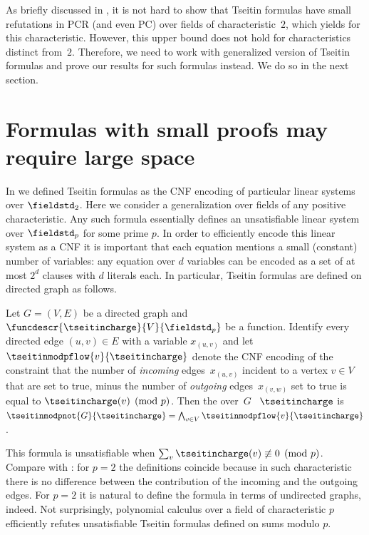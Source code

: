 As briefly discussed in 
, 
it is not hard to show that Tseitin formulas have small 
refutations in PCR (and even PC) over fields of characteristic~$2$,
which yields
for this characteristic. 
However, this upper bound does not hold for characteristics distinct
from~$2$. 
%
Therefore, we need to work with generalized version of Tseitin formulas
and prove our results for such formulas instead. We do so in the next section.
%

\section{Formulas with small proofs may require large space}
\label{sec:tseitinseparation}

In  we defined Tseitin formulas as the
CNF encoding of particular linear systems over $\fieldstd_{2}$.  Here we
consider a generalization over fields of any positive characteristic.
%
Any such formula essentially defines an unsatisfiable linear system over
$\fieldstd_{p}$ for some prime $p$. In order to efficiently encode this
linear system as a CNF it is important that each equation mentions a
small (\egComma constant) number of variables: any equation over $d$
variables can be encoded as a set of at most $2^{d}$ clauses with $d$
literals each.  In particular, Tseitin formulas are defined on
directed graph as follows.

\begin{definition}\label{def:tseitinmodp}
  Let $G = (V,E)$ be a directed graph and
  $\funcdescr{\tseitincharge}{V}{\fieldstd_p}$
  be a function.
  Identify every directed edge $(u,v) \in E$ with a variable $x_{(u,v)}$
  and  let
  $\tseitinmodpflow{v}{\tseitincharge}$
  denote the CNF encoding
  of the constraint
  that the number of \emph{incoming} edges~$x_{(u,v)}$ incident to a vertex $v \in V$ that are set to true, minus the number of \emph{outgoing} edges~$x_{(v,w)}$ set to true is equal to $\tseitincharge(v) \pmod{p}$.
  Then the  over~$G$ \wrt{}~$\tseitincharge$
  is $\tseitinmodpnot{G}{\tseitincharge}=
  \bigwedge_{v\in V}\tseitinmodpflow{v}{\tseitincharge}$.
\end{definition}

This formula is unsatisfiable when $\sum_{v}\tseitincharge(v)\not\equiv 0
\pmod{p}$. Compare  with
: for $p=2$ the definitions
coincide because in such characteristic there is no difference
between the contribution of the incoming and the outgoing edges. For
$p=2$ it is natural to define the formula in terms of undirected
graphs, indeed.
%
Not surprisingly, polynomial calculus over a field of characteristic
$p$ efficiently refutes unsatisfiable Tseitin formulas defined on
sums modulo $p$.

